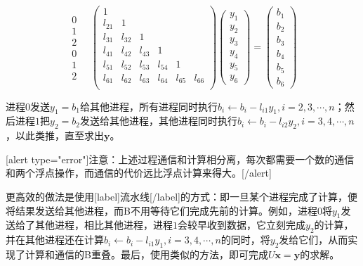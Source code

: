 \documentclass[UTF8,nofonts]{ctexart}
\begin{document}
\[
\begin{matrix}0\\1\\2\\0\\1\\2\end{matrix}\quad
\begin{pmatrix}
	1&&&&&\\
	l_{21}&1&&&&\\
	l_{31}&l_{32}&1&&&\\
	l_{41}&l_{42}&l_{43}&1&&\\
	l_{51}&l_{52}&l_{53}&l_{54}&1&\\
	l_{61}&l_{62}&l_{63}&l_{64}&l_{65}&l_{66}\\
\end{pmatrix}
\begin{pmatrix}y_1\\y_2\\y_3\\y_4\\y_5\\y_6\end{pmatrix}=
\begin{pmatrix}b_1\\b_2\\b_3\\b_4\\b_5\\b_6\end{pmatrix}
\]

进程$0$发送$y_1=b_1$给其他进程，所有进程同时执行$b_i\gets b_i-l_{i1}y_1,i=2,3,\cdots,n$；然后进程$1$把$y_2=b_2$发送给其他进程，其他进程同时执行$b_i\gets b_i-l_{i2}y_2,i=3,4,\cdots,n$，以此类推，直至求出$\boldsymbol{y}$。

[alert type="error"]注意：上述过程通信和计算相分离，每次都需要一个数的通信和两个浮点操作，而通信的代价远比浮点计算来得大。[/alert]

更高效的做法是使用[label]流水线[/label]的方式：即一旦某个进程完成了计算，便将结果发送给其他进程，而B不用等待它们完成先前的计算。例如，进程$0$将$y_1$发送给了其他进程，相比其他进程，进程$1$会较早收到数据，它立刻完成$y_2$的计算，并在其他进程还在计算$b_i\gets b_i-l_{i1}y_1,i=3,4,\cdots,n$的同时，将$y_2$发给它们，从而实现了计算和通信的B重叠。最后，使用类似的方法，即可完成$U\boldsymbol{x}=\boldsymbol{y}$的求解。
\end{document}
